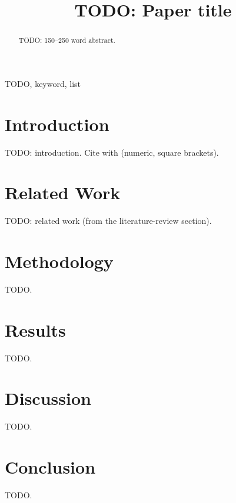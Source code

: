 \documentclass[conference]{IEEEtran}
\begin{document}
\title{TODO: Paper title}

\author{
}

\maketitle

\begin{abstract}
TODO: 150--250 word abstract. %
\end{abstract}

\begin{IEEEkeywords}
TODO, keyword, list
\end{IEEEkeywords}

\section{Introduction}
TODO: introduction. Cite with \cite{example2024} (numeric, square brackets).

\section{Related Work}
TODO: related work (from the literature-review section).

\section{Methodology}
TODO.

\section{Results}
TODO.

\section{Discussion}
TODO.

\section{Conclusion}
TODO.



\end{document}
